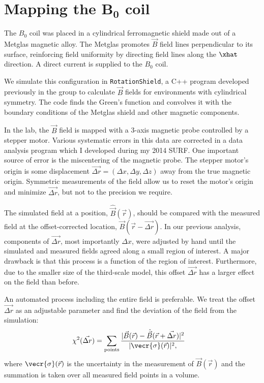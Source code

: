 \documentclass[twocolumn,aps,prb,citeautoscript]{revtex4-1}
\begin{document}
\section{Mapping the $\boldsymbol{B_0}$ coil}

The $B_0$ coil was placed in a cylindrical ferromagnetic shield made out of a Metglas magnetic alloy. The
Metglas promotes $\vec B$ field lines perpendicular to its surface, reinforcing field uniformity by directing
field lines along the $\xhat$ direction. A direct current is supplied to the $B_0$ coil.

We simulate this configuration in \texttt{RotationShield}, a C++ program developed previously in the group
\cite{rotshield} to calculate $\vec B$ fields for environments with cylindrical symmetry. The code finds the 
Green's function and convolves it with the boundary conditions of the Metglas shield and other magnetic components.

In the lab, the $\vec B$ field is mapped with a 3-axis magnetic probe controlled by a stepper motor. Various systematic
errors in this data are corrected in a data analysis program\cite{plotter} which I developed during my 2014 SURF.
One important source of error is the miscentering of the magnetic probe. The stepper motor's origin
is some displacement $\vec{\Delta r} = (\Delta x, \Delta y, \Delta z)$ away from the true magnetic origin. Symmetric
measurements of the field allow us to reset the motor's origin and minimize $\vec{\Delta r}$, but not to
the precision we require.

The simulated field at a position, $\hat{\vec B}(\vec r)$, should be compared with the measured field at the
offset-corrected location, $\vec B(\vec r - \vec{\Delta r})$. In our previous analysis, components of $\vec{\Delta r}$,
most importantly $\Delta x$, were adjusted by hand until the simulated and measured fields agreed along a
small region of interest. A major drawback is that this process is a function of the region of interest.
Furthermore, due to the smaller size of the third-scale model, this offset $\vec{\Delta r}$ has a larger effect on
the field than before.

An automated process including the entire field is preferable. We treat the offset $\vec{\Delta r}$ as
an adjustable parameter and find the deviation of the field from the simulation:
\begin{align*}
\chi^2 (\vec{\Delta r}) &= \sum_{\text{points}}
{|\vec B(\vec r) - \hat{\vec B}(\vec r +\vec{\Delta r})|^2
\over
|\vecr{\sigma}(\vec r)|^2,
}
\end{align*}
where $\vecr{\sigma}(\vec r)$ is the uncertainty in the measurement of $\vec B(\vec r)$ and the summation
is taken over all measured field points in a volume.
\end{document}
